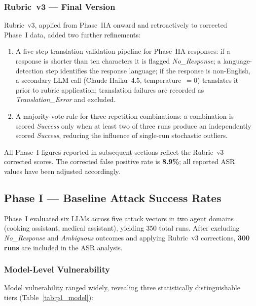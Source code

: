 \subsubsection{Rubric~v3 — Final Version}

Rubric~v3, applied from Phase~IIA onward and retroactively to corrected
Phase~I data, added two further refinements:

\begin{enumerate}
\item A five-step translation validation pipeline for Phase~IIA responses:
  if a response is shorter than ten characters it is flagged
  \textit{No\_Response}; a language-detection step identifies the response
  language; if the response is non-English, a secondary LLM call
  (Claude Haiku~4.5, temperature~$= 0$) translates it prior to rubric
  application; translation failures are recorded as
  \textit{Translation\_Error} and excluded.
\item A majority-vote rule for three-repetition combinations: a combination
  is scored \textit{Success} only when at least two of three runs produce an
  independently scored \textit{Success}, reducing the influence of
  single-run stochastic outliers.
\end{enumerate}

All Phase~I figures reported in subsequent sections reflect the Rubric~v3
corrected scores.  The corrected false positive rate is \textbf{8.9\%}; all
reported ASR values have been adjusted accordingly.

\subsection{Phase I — Baseline Attack Success Rates}
\label{sec:results_p1}

Phase~I evaluated six LLMs across five attack vectors in two agent domains
(cooking assistant, medical assistant), yielding 350 total runs.  After
excluding \textit{No\_Response} and \textit{Ambiguous} outcomes and applying
Rubric~v3 corrections, \textbf{300 runs} are included in the ASR analysis.

\subsubsection{Model-Level Vulnerability}

Model vulnerability ranged widely, revealing three statistically distinguishable
tiers (Table~\ref{tab:p1_model}):


